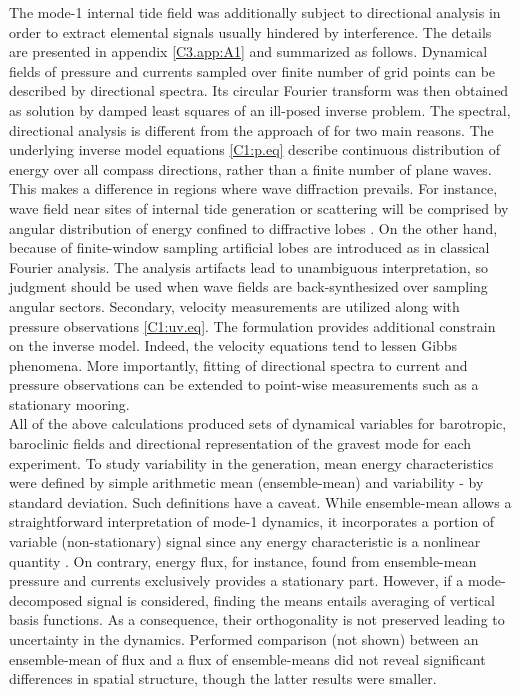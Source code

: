 \documentclass[12pt]{article}
\begin{document}
The mode-1 internal tide field was additionally subject to directional analysis in order to 
extract elemental signals usually hindered by interference. The details are presented in appendix 
\ref{C3.app:A1} and summarized as follows. Dynamical fields of pressure and currents sampled over 
finite number of grid points can be described by directional 
spectra. Its circular Fourier 
transform was then obtained as solution by damped least squares of an ill-posed inverse problem. 
The 
spectral, directional analysis is different from the approach of \cite{zhao2010long} for two main 
reasons. The underlying inverse model equations \eqref{C1:p.eq} describe continuous distribution of 
energy over all compass directions, rather than a finite number of plane waves. This makes a 
difference in regions 
where wave diffraction prevails. For instance, wave field near sites of internal tide generation or 
scattering will be comprised by angular distribution of energy confined to diffractive lobes 
\citep[e.g.,][]{munroe2005topographic, johnston2003internal}. On 
the other hand, because of finite-window sampling artificial lobes are introduced as in classical 
Fourier analysis. The analysis artifacts lead to unambiguous interpretation, so judgment should be 
used when wave fields are back-synthesized over sampling angular sectors. Secondary, 
velocity measurements are utilized along with pressure observations \eqref{C1:uv.eq}. The 
formulation provides additional constrain on the inverse model. Indeed, the velocity equations tend 
to 
lessen Gibbs phenomena. More importantly, fitting of directional spectra to current and pressure 
observations can be extended to point-wise measurements such as a stationary mooring.\\

All of the above calculations produced sets of dynamical variables for barotropic, baroclinic 
fields and directional representation of the gravest mode for each experiment. To study 
variability in the generation, mean energy characteristics were defined by simple arithmetic mean 
(ensemble-mean) and variability - by standard deviation. Such definitions have a caveat. 
While ensemble-mean allows a straightforward interpretation of mode-1 dynamics, it 
incorporates  
a portion of variable (non-stationary) signal since any energy characteristic is a nonlinear 
quantity \citep{zaron2014time}. On contrary, energy flux, for instance, found from ensemble-mean 
pressure and currents exclusively provides a stationary part. However, if a mode-decomposed signal 
is considered, finding the means entails averaging of vertical basis functions. As a 
consequence, their orthogonality is not preserved leading to uncertainty in the dynamics. 
Performed comparison (not shown) between an ensemble-mean of flux and a flux of ensemble-means did 
not reveal significant differences in spatial structure, though the latter results were smaller.
\end{document}
